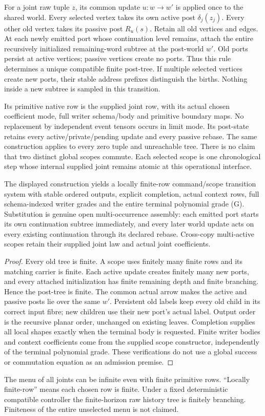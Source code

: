 \documentclass[11pt]{article}
\begin{document}
For a joint raw tuple $z$, its common update $u:w\to w'$ is applied once to the shared world. Every selected vertex takes its own active post $\delta_j(z_j)$. Every other old vertex takes its passive post $R_u(s)$. Retain all old vertices and edges. At each newly emitted port whose continuation level remains, attach the entire recursively initialized remaining-word subtree at the post-world $w'$. Old ports persist at active vertices; passive vertices create no ports. Thus this rule determines a unique compatible finite post-tree. If multiple selected vertices create new ports, their stable address prefixes distinguish the births. Nothing inside a new subtree is sampled in this transition.

Its primitive native row is the supplied joint row, with its actual chosen coefficient mode, full writer schema/body and primitive boundary maps. No replacement by independent event tensors occurs in limit mode. Its post-state retains every active/private/pending update and every passive rebase. The same construction applies to every zero tuple and unreachable tree. There is no claim that two distinct global scopes commute. Each selected scope is one chronological step whose internal supplied joint remains atomic at this operational interface.

\begin{theorem}
The displayed construction yields a locally finite-row command/scope transition system with stable ordered outputs, explicit completion, actual context rows, full schema-indexed writer grades and the entire terminal polynomial grade (G). Substitution is genuine open multi-occurrence assembly: each emitted port starts its own continuation subtree immediately, and every later world update acts on every existing continuation through its declared rebase. Cross-copy multi-active scopes retain their supplied joint law and actual joint coefficients.
\end{theorem}
\begin{proof}
Every old tree is finite. A scope uses finitely many finite rows and its matching carrier is finite. Each active update creates finitely many new ports, and every attached initialization has finite remaining depth and finite branching. Hence the post-tree is finite. The common actual arrow makes the active and passive posts lie over the same $w'$. Persistent old labels keep every old child in its correct input fibre; new children use their new port's actual label. Output order is the recursive planar order, unchanged on existing leaves. Completion supplies all local shapes exactly when the terminal body is requested. Finite writer bodies and context coefficients come from the supplied scope constructor, independently of the terminal polynomial grade. These verifications do not use a global success or commutation equation as an admission premise.
\end{proof}
The menu of all joints can be infinite even with finite primitive rows. ``Locally finite-row'' means each chosen row is finite. Under a fixed deterministic compatible controller the finite-horizon raw history tree is finitely branching. Finiteness of the entire unselected menu is not claimed.
\end{document}
